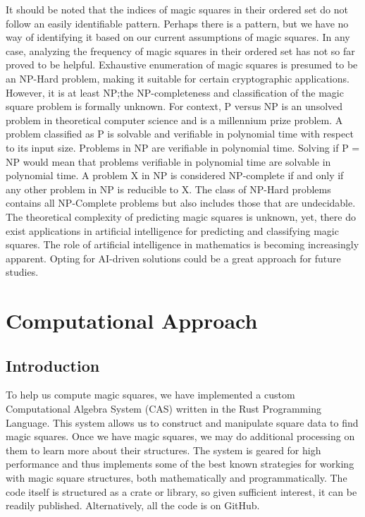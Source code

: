\documentclass[12pt]{report}
\begin{document}
\par It should be noted that the indices of magic squares in their ordered set do not follow an
easily identifiable pattern. Perhaps there is a pattern, but we have no way of identifying it based
on our current assumptions of magic squares. In any case, analyzing the frequency of magic squares
in their ordered set has not so far proved to be helpful. Exhaustive enumeration of magic squares
is presumed to be an NP-Hard problem, making it suitable for certain cryptographic applications.
However, it is at least NP;\@ the NP-completeness and classification of the magic square problem is
formally unknown. For context, P versus NP is an unsolved problem in theoretical computer science
and is a millennium prize problem. A problem classified as P is solvable and verifiable in
polynomial time with respect to its input size. Problems in NP are verifiable in polynomial time.
Solving if P = NP would mean that problems verifiable in polynomial time are solvable in polynomial
time. A problem X in NP is considered NP-complete if and only if any other problem in NP is
reducible to X. The class of NP-Hard problems contains all NP-Complete problems but also includes
those that are undecidable. The theoretical complexity of predicting magic squares is unknown, yet,
there do exist applications in artificial intelligence for predicting and classifying magic
squares\cite{Weed}. The role of artificial intelligence in mathematics is becoming increasingly
apparent. Opting for AI-driven solutions could be a great approach for future studies.

\chapter{Computational Approach}

\section{Introduction}

\par To help us compute magic squares, we have implemented a custom Computational Algebra System
(CAS) written in the Rust Programming Language. This system allows us to construct and manipulate
square data to find magic squares. Once we have magic squares, we may do additional processing on
them to learn more about their structures. The system is geared for high performance and thus
implements some of the best known strategies for working with magic square structures, both
mathematically and programmatically. The code itself is structured as a crate or library, so given
sufficient interest, it can be readily published. Alternatively, all the code is on
GitHub\cite{Keough}.
\end{document}
